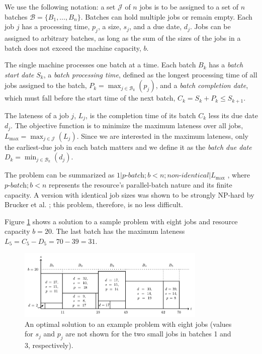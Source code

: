 \documentclass[oribibl]{llncs}
\def\Lmax{{L_{\mathrm{max}}}}
\begin{document}
We use the following notation: a set $\mathcal{J}$ of $n$ jobs
is to be assigned to a set of $n$ batches $\mathcal{B} = \{B_1,\dots,B_n\}$.
Batches can hold multiple jobs or remain empty. Each
job $j$ has a processing time, $p_j$, a size, $s_j$,
and a due date, $d_j$. Jobs can be assigned to arbitrary batches, as long as the sum of the sizes of the jobs in a batch does not exceed
the machine capacity, $b$.

The single machine processes one batch at a time. Each batch $B_k$ has a
\textit{batch start date} $S_k$, a \textit{batch processing time},
defined as the longest processing time of all jobs assigned to the
batch, $P_k = \max_{j\in \mathcal{B}_k}(p_j)$, and a \textit{batch completion
  date}, which must fall before the start time of the next batch, $C_k
= S_k + P_k \leq S_{k+1}$.

The lateness of a job $j$, $L_j$, is the completion time of its batch
$C_k$ less its due date $d_j$. The objective function is to minimize the
maximum lateness over all jobs, $\Lmax = \max_{j \in \mathcal{J}}(L_j)$. Since we
are interested in the maximum lateness, only the earliest-due job in
each batch matters and we define it as the \textit{batch due date}
$D_k = \min_{j\in \mathcal{B}_k}(d_j)$.

The problem can be summarized as $1|\textit{p-batch}; b
< n; \textit{non-identical}|\Lmax$ \cite{Daste1, Malapert}, where
$\textit{p-batch};b<n$ represents the resource's parallel-batch nature and its
finite capacity. A version with identical job
sizes was shown to be strongly NP-hard by Brucker et al. \cite{Brucker};
this problem, therefore, is no less difficult.

Figure \ref{fig:intro_tetris} shows a solution to a sample
problem with eight jobs and resource capacity $b = 20$. The last batch
has the maximum lateness $L_5 = C_5 - D_5 = 70 - 39 = 31$.

\begin{figure}[t]
\centering
\includegraphics[width=0.8\textwidth]{tetris.pdf}
\caption{An optimal solution to an example problem with eight jobs (values for
  $s_j$ and $p_j$ are not shown for the two small jobs in batches 1 and 3,
respectively).}
  \label{fig:intro_tetris}
\end{figure}
\end{document}
